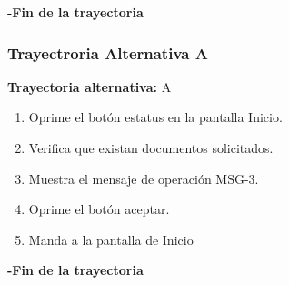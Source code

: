 \textbf{-Fin de la trayectoria}

\subsubsection{Trayectroria Alternativa A}
\textbf{Trayectoria alternativa:} A \\
\begin{enumerate}
	\item Oprime el botón estatus en la pantalla Inicio.
	\item Verifica que existan documentos solicitados.
	\item Muestra el mensaje de operación MSG-3.
	\item Oprime el botón aceptar. 
	\item Manda a la pantalla de Inicio
\end{enumerate}

\textbf{-Fin de la trayectoria}